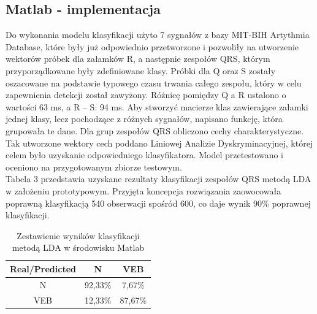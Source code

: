 \documentclass[[10pt,a4paper]{article}
\begin{document}
\subsection{Matlab - implementacja}

Do wykonania modelu klasyfikacji użyto 7 sygnałów z bazy MIT-BIH Artythmia Database, które były już odpowiednio przetworzone i pozwoliły na utworzenie wektorów próbek dla załamków R, a następnie zespołów QRS, którym przyporządkowane były zdefiniowane klasy. Próbki dla Q oraz S zostały oszacowane na podstawie typowego czasu trwania całego zespołu, który w celu zapewnienia detekcji został zawyżony. Różnicę pomiędzy Q a R ustalono o wartości 63 ms, a R -- S: 94 ms. Aby stworzyć macierze klas zawierające załamki jednej klasy, lecz pochodzące z różnych sygnałów, napisano funkcję, która grupowała te dane. Dla grup zespołów QRS obliczono cechy charakterystyczne. Tak utworzone wektory cech poddano Liniowej Analizie Dyskryminacyjnej, której celem było uzyskanie odpowiedniego klasyfikatora. Model przetestowano i oceniono na przygotowanym zbiorze testowym.\\

Tabela 3 przedstawia uzyskane rezultaty klasyfikacji zespołów QRS metodą LDA w założeniu prototypowym. Przyjęta koncepcja rozwiązania zaowocowała poprawną klasyfikacją 540 obserwacji spośród 600, co daje wynik 90\% poprawnej klasyfikacji. 

\begin{table}[h]
\centering
\caption{Zestawienie wyników klasyfikacji metodą LDA w środowisku Matlab}
\label{my-label}
\begin{tabular}{c|c|c}
Real/Predicted & N       & VEB     \\ \hline
N              & 92,33\% & 7,67\%  \\ \hline
VEB            & 12,33\% & 87,67\%
\end{tabular}
\end{table}
\end{document}
